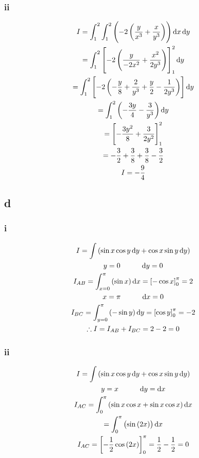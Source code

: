 \documentclass[11pt]{article}
\numberwithin{equation}{section}
\begin{document}
\subsubsection{ii}
\begin{gather}
    I = \int_{1}^{2} \int_{1}^{2} \left(-2\left(\frac{y}{x^3}+\frac{x}{y^3}\right)\right) \dif x \dif y\\
    = \int_{1}^{2} \left[-2\left(\frac{y}{-2x^2} + \frac{x^2}{2y^3}\right)\right]_1^2 \dif y\\
    = \int_{1}^{2} \left[-2\left(-\frac{y}{8} + \frac{2}{y^3}+\frac{y}{2} - \frac{1}{2y^3}\right)\right] \dif y\\
    = \int_{1}^{2} \left(-\frac{3y}{4}-\frac{3}{y^3}\right) \dif y\\
    = \left[-\frac{3y^2}{8}+\frac{3}{2y^2}\right]_1^2\\
    = -\frac{3}{2} + \frac{3}{8} + \frac{3}{8} - \frac{3}{2}\\
    I = -\frac{9}{4}
\end{gather}
\subsection{d}
\subsubsection{i}
\begin{gather}
    I = \int \left(\sin x \cos y \dif y + \cos x \sin y \dif y\right)\\
    y = 0 \hspace{1cm} \dif y = 0\\
    I_{AB} = \int_{x=0}^{\pi} \left(\sin x\right)\dif x = \left[-\cos x\right]_0^{\pi} = 2\\
    x = \pi \hspace{1cm} \dif x = 0\\
    I_{BC} = \int_{y=0}^{\pi} \left(-\sin y\right)\dif y= \left[\cos y\right]_0^{\pi} = -2\\
    \therefore I = I_{AB} + I_{BC} = 2-2 = 0
\end{gather}
\subsubsection{ii}
\begin{gather}
    I = \int \left(\sin x \cos y \dif y + \cos x \sin y \dif y\right)\\
    y = x \hspace{1cm} \dif y = \dif x\\
    I_{AC} = \int_0^{\pi} \left(\sin x \cos x + \sin x \cos x\right) \dif x\\
    = \int_0^{\pi} \left(\sin \left(2x\right)\right)\dif x\\
    I_{AC} = \left[-\frac{1}{2}\cos \left(2x\right)\right]_0^{\pi} = \frac{1}{2} - \frac{1}{2} = 0\\
\end{gather}
\end{document}
